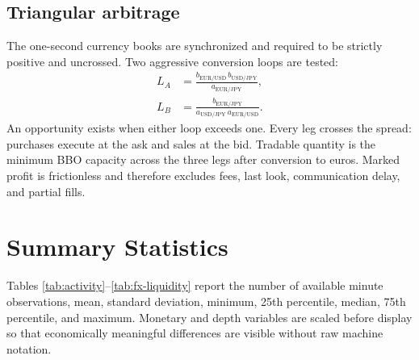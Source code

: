 \documentclass[11pt]{article}
\begin{document}
\subsection{Triangular arbitrage}

The one-second currency books are synchronized and required to be strictly positive and uncrossed. Two aggressive conversion loops are tested:
\begin{align}
  L_A &= \frac{b_{\mathrm{EUR/USD}}\,b_{\mathrm{USD/JPY}}}
               {a_{\mathrm{EUR/JPY}}},\\
  L_B &= \frac{b_{\mathrm{EUR/JPY}}}
               {a_{\mathrm{USD/JPY}}\,a_{\mathrm{EUR/USD}}}.
\end{align}
An opportunity exists when either loop exceeds one. Every leg crosses the spread: purchases execute at the ask and sales at the bid. Tradable quantity is the minimum BBO capacity across the three legs after conversion to euros. Marked profit is frictionless and therefore excludes fees, last look, communication delay, and partial fills.

\section{Summary Statistics}

Tables \ref{tab:activity}--\ref{tab:fx-liquidity} report the number of available minute observations, mean, standard deviation, minimum, 25th percentile, median, 75th percentile, and maximum. Monetary and depth variables are scaled before display so that economically meaningful differences are visible without raw machine notation.
\end{document}
